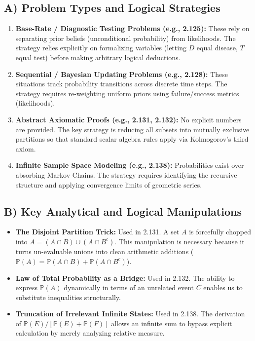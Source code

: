 \documentclass[12pt]{article}
\begin{document}
\subsection{A) Problem Types and Logical Strategies}
\begin{enumerate}
    \item \textbf{Base-Rate / Diagnostic Testing Problems (e.g., 2.125):} These rely on separating prior beliefs (unconditional probability) from likelihoods. The strategy relies explicitly on formalizing variables (letting $D$ equal disease, $T$ equal test) before making arbitrary logical deductions. 
    \item \textbf{Sequential / Bayesian Updating Problems (e.g., 2.128):} These situations track probability transitions across discrete time steps. The strategy requires re-weighting uniform priors using failure/success metrics (likelihoods). 
    \item \textbf{Abstract Axiomatic Proofs (e.g., 2.131, 2.132):} No explicit numbers are provided. The key strategy is reducing all subsets into mutually exclusive partitions so that standard scalar algebra rules apply via Kolmogorov's third axiom.
    \item \textbf{Infinite Sample Space Modeling (e.g., 2.138):} Probabilities exist over absorbing Markov Chains. The strategy requires identifying the recursive structure and applying convergence limits of geometric series.
\end{enumerate}

\subsection{B) Key Analytical and Logical Manipulations}
\begin{itemize}
    \item \textbf{The Disjoint Partition Trick:} Used in 2.131. A set $A$ is forcefully chopped into $A = (A \cap B) \cup (A \cap B^c)$. This manipulation is necessary because it turns un-evaluable unions into clean arithmetic additions ($\mathbb{P}(A) = \mathbb{P}(A \cap B) + \mathbb{P}(A \cap B^c)$).
    \item \textbf{Law of Total Probability as a Bridge:} Used in 2.132. The ability to express $\mathbb{P}(A)$ dynamically in terms of an unrelated event $C$ enables us to substitute inequalities structurally. 
    \item \textbf{Truncation of Irrelevant Infinite States:} Used in 2.138. The derivation of $\mathbb{P}(E) / [\mathbb{P}(E) + \mathbb{P}(F)]$ allows an infinite sum to bypass explicit calculation by merely analyzing relative measure.
\end{itemize}
\end{document}
